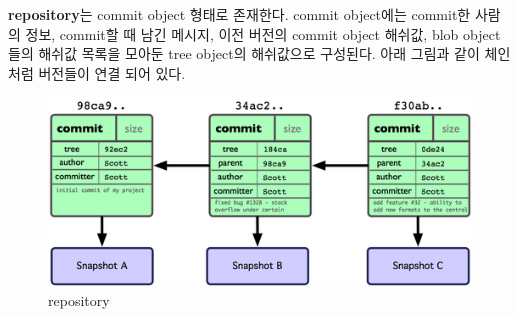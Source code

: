 \documentclass[letterpaper,12pt]{article}
\begin{document}
\textbf{repository}는 commit object 형태로 존재한다. commit object에는 commit한 사람의 정보, commit할 때 남긴 메시지, 이전 버전의 commit object 해쉬값, blob object들의 해쉬값 목록을 모아둔 tree object의 해쉬값으로 구성된다. 아래 그림과 같이 체인처럼 버전들이 연결 되어 있다.
\begin{figure}[ht] 
        \centering \includegraphics[width=0.8\columnwidth]{repository}
         \caption{
                \label{fig:repository}  
                repository
        }
\end{figure}
\end{document}
